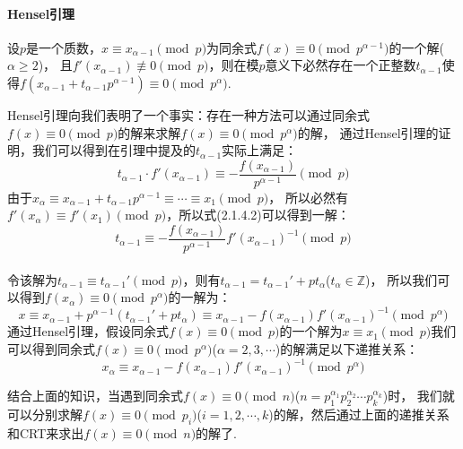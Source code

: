 \documentclass{article}
\numberwithin{equation}{subsubsection}
\begin{document}
\paragraph{\textbf{Hensel引理}}
设$p$是一个质数，$x\equiv x_{\alpha-1}\pmod{p}$为同余式$f(x)\equiv 0\pmod{p^{\alpha-1}}$的一个解($\alpha\ge 2$)，
且$f'(x_{\alpha-1})\not\equiv 0\pmod{p}$，则在模$p$意义下必然存在一个正整数$t_{\alpha-1}$使得$f(x_{\alpha-1}+t_{\alpha-1}p^{\alpha-1})\equiv 0\pmod{p^\alpha}$.\par
Hensel引理向我们表明了一个事实：存在一种方法可以通过同余式$f(x)\equiv 0\pmod{p}$的解来求解$f(x)\equiv 0\pmod{p^\alpha}$的解，
通过Hensel引理的证明，我们可以得到在引理中提及的$t_{\alpha-1}$实际上满足：
\begin{equation}
    t_{\alpha-1}\cdot f'(x_{\alpha-1})\equiv -\frac{f(x_{\alpha-1})}{p^{\alpha-1}}\pmod{p}
\end{equation}
由于$x_{\alpha}\equiv x_{\alpha-1} + t_{\alpha-1}p^{\alpha-1}\equiv\cdots\equiv x_1\pmod{p}$，
所以必然有$f'(x_{\alpha})\equiv f'(x_1)\pmod{p}$，所以式(2.1.4.2)可以得到一解：
\begin{equation}
    t_{\alpha-1}\equiv -\frac{f(x_{\alpha-1})}{p^{\alpha-1}}f'(x_{\alpha-1})^{-1}\pmod{p}
    \nonumber
\end{equation}\\
令该解为$t_{\alpha-1}\equiv t_{\alpha-1}' \pmod{p}$，则有$t_{\alpha-1}=t_{\alpha-1}'+pt_{\alpha}$($t_{\alpha}\in\mathbb{Z}$)，
所以我们可以得到$f(x_{\alpha})\equiv 0\pmod{p^\alpha}$的一解为：
\begin{equation}
    x\equiv x_{\alpha-1}+p^{\alpha-1}(t_{\alpha-1}'+pt_{\alpha})\equiv x_{\alpha-1}-f(x_{\alpha-1})f'(x_{\alpha-1})^{-1}\pmod{p^\alpha}
    \nonumber
\end{equation}
通过Hensel引理，假设同余式$f(x)\equiv 0\pmod{p}$的一个解为$x\equiv x_1\pmod{p}$我们可以得到同余式$f(x)\equiv 0\pmod{p^\alpha}$($\alpha=2,3,\cdots$)的解满足以下递推关系：
\begin{equation}
    x_{\alpha} \equiv x_{\alpha-1}-f(x_{\alpha-1})f'(x_{\alpha-1})^{-1}\pmod{p^\alpha}
    \nonumber
\end{equation}\par
结合上面的知识，当遇到同余式$f(x)\equiv 0\pmod{n}$($n=p_1^{\alpha_1}p_2^{\alpha_2}\cdots p_k^{\alpha_k}$)时，
我们就可以分别求解$f(x)\equiv 0\pmod{p_i}$($i=1,2,\cdots,k$)的解，然后通过上面的递推关系和CRT来求出$f(x)\equiv 0\pmod{n}$的解了.\par
\end{document}
